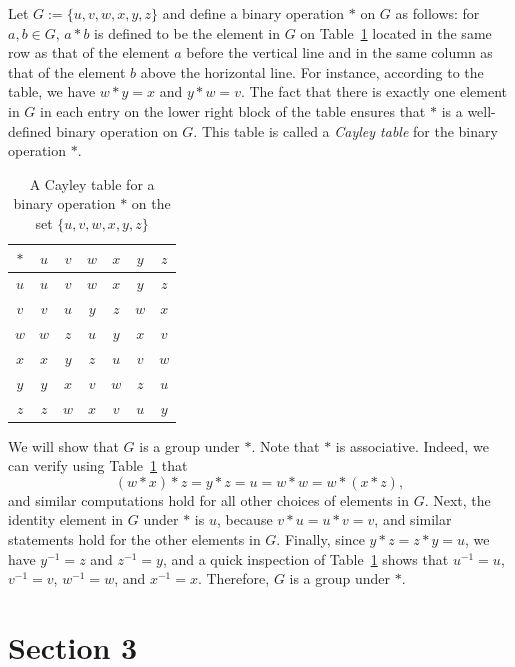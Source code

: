 \begin{ex}
	Let $G:=\{u,v,w,x,y,z\}$ and define a binary operation $*$ on $G$ as follows: for $a,b\in G$, $a*b$ is defined to be the element in $G$ on Table~\ref{deesix} located in the same row as that of the element $a$ before the vertical line and in the same column as that of the element $b$ above the horizontal line. For instance, according to the table, we have $w*y=x$ and $y*w=v$. The fact that there is exactly one element in $G$ in each entry on the lower right block of the table ensures that $*$ is a well-defined binary operation on $G$. This table is called a \textit{Cayley table} for the binary operation $*$.
	
	\begin{table}[!htbp]
		\centering
		\caption{A Cayley table for a binary operation $*$ on the set $\{u,v,w,x,y,z\}$}
		\vspace{10pt}
		\begin{tabular}{c|c c c c c c} 
			$*$ & $u$ & $v$ & $w$ & $x$ & $y$ & $z$ \\ 
			\hline
			$u$ & $u$ & $v$ & $w$ & $x$ & $y$ & $z$ \\
			$v$ & $v$ & $u$ & $y$ & $z$ & $w$ & $x$ \\
			$w$ & $w$ & $z$ & $u$ & $y$ & $x$ & $v$ \\
			$x$ & $x$ & $y$ & $z$ & $u$ & $v$ & $w$ \\
			$y$ & $y$ & $x$ & $v$ & $w$ & $z$ & $u$ \\
			$z$ & $z$ & $w$ & $x$ & $v$ & $u$ & $y$
		\end{tabular}
		\label{deesix}
	\end{table}
	
	\noindent We will show that $G$ is a group under $*$. Note that $*$ is associative. Indeed, we can verify using Table~\ref{deesix} that
	\[
	(w*x)*z=y*z=u=w*w=w*(x*z),
	\]
	and similar computations hold for all other choices of elements in $G$. Next, the identity element in $G$ under $*$ is $u$, because $v*u=u*v=v$, and similar statements hold for the other elements in $G$. Finally, since $y*z=z*y=u$, we have $y^{-1}=z$ and $z^{-1}=y$, and a quick inspection of Table~\ref{deesix} shows that $u^{-1}=u$, $v^{-1}=v$, $w^{-1}=w$, and $x^{-1}=x$. Therefore, $G$ is a group under $*$.
\end{ex}

\section{Section 3}

